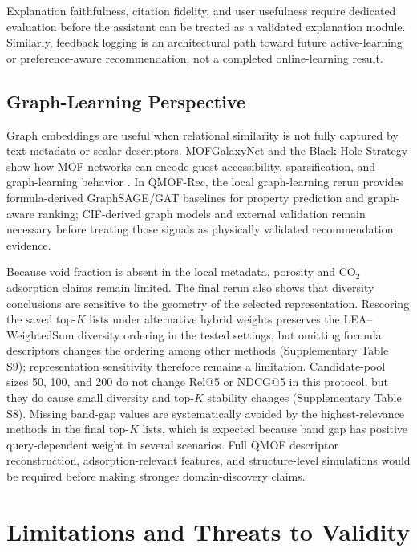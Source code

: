 \documentclass[12pt,a4paper]{article}
\begin{document}
Explanation faithfulness, citation fidelity, and user usefulness require dedicated evaluation before the assistant can be treated as a validated explanation module. Similarly, feedback logging is an architectural path toward future active-learning or preference-aware recommendation, not a completed online-learning result.

\subsection{Graph-Learning Perspective}

Graph embeddings are useful when relational similarity is not fully captured by text metadata or scalar descriptors. MOFGalaxyNet and the Black Hole Strategy show how MOF networks can encode guest accessibility, sparsification, and graph-learning behavior \cite{jalali2023,jalali2025bh}. In QMOF-Rec, the local graph-learning rerun provides formula-derived GraphSAGE/GAT baselines for property prediction and graph-aware ranking; CIF-derived graph models and external validation remain necessary before treating those signals as physically validated recommendation evidence.

Because void fraction is absent in the local metadata, porosity and CO$_2$ adsorption claims remain limited. The final rerun also shows that diversity conclusions are sensitive to the geometry of the selected representation. Rescoring the saved top-$K$ lists under alternative hybrid weights preserves the LEA--WeightedSum diversity ordering in the tested settings, but omitting formula descriptors changes the ordering among other methods (Supplementary Table S9); representation sensitivity therefore remains a limitation. Candidate-pool sizes 50, 100, and 200 do not change Rel@5 or NDCG@5 in this protocol, but they do cause small diversity and top-$K$ stability changes (Supplementary Table S8). Missing band-gap values are systematically avoided by the highest-relevance methods in the final top-$K$ lists, which is expected because band gap has positive query-dependent weight in several scenarios. Full QMOF descriptor reconstruction, adsorption-relevant features, and structure-level simulations would be required before making stronger domain-discovery claims.

\section{Limitations and Threats to Validity}
\label{sec:limitations}
\end{document}
